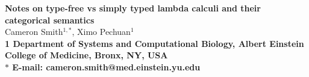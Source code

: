 \begin{flushleft}
{\Large
\textbf{Notes on type-free vs simply typed lambda calculi and their categorical semantics}
}
\\
Cameron Smith$^{1, \ast}$,
Ximo Pechuan$^{1}$
\\
\bf{1} Department of Systems and Computational Biology, Albert Einstein College of Medicine, Bronx, NY, USA
\\
$\ast$ E-mail: cameron.smith@med.einstein.yu.edu
\end{flushleft}
